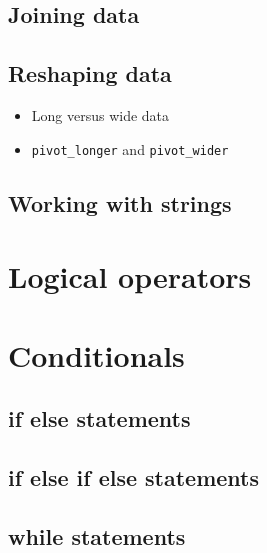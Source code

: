 \documentclass[
]{book}
\providecommand{\tightlist}{%
  \setlength{\itemsep}{0pt}\setlength{\parskip}{0pt}}
\begin{document}
\hypertarget{joining-data}{%
\section{Joining data}\label{joining-data}}

\hypertarget{reshaping-data}{%
\section{Reshaping data}\label{reshaping-data}}

\begin{itemize}
\tightlist
\item
  Long versus wide data
\item
  \texttt{pivot\_longer} and \texttt{pivot\_wider}
\end{itemize}

\hypertarget{working-with-strings}{%
\section{Working with strings}\label{working-with-strings}}

\hypertarget{logicals}{%
\chapter{Logical operators}\label{logicals}}

\hypertarget{conditionals}{%
\chapter{Conditionals}\label{conditionals}}

\hypertarget{if-else-statements}{%
\section{if else statements}\label{if-else-statements}}

\hypertarget{if-else-if-else-statements}{%
\section{if else if else statements}\label{if-else-if-else-statements}}

\hypertarget{while-statements}{%
\section{while statements}\label{while-statements}}
\end{document}
